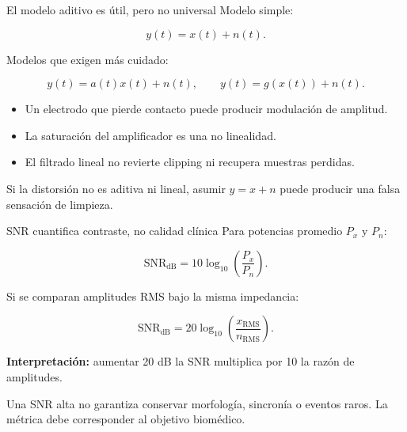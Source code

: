 \documentclass[
  ignorenonframetext,
  aspectratio=169,
  spanish,
  professionalfonts]{beamer}
\providecommand{\tightlist}{%
  \setlength{\itemsep}{0pt}\setlength{\parskip}{0pt}}
\begin{document}
\begin{frame}[shrink]{El modelo aditivo es útil, pero no universal}
\protect{}\label{el-modelo-aditivo-es-uxfatil-pero-no-universal}
Modelo simple:

\[
y(t)=x(t)+n(t).
\]

Modelos que exigen más cuidado:

\[
y(t)=a(t)x(t)+n(t), \qquad
y(t)=g\!\left(x(t)\right)+n(t).
\]

\begin{itemize}
\tightlist
\item
  Un electrodo que pierde contacto puede producir modulación de
  amplitud.
\item
  La saturación del amplificador es una no linealidad.
\item
  El filtrado lineal no revierte clipping ni recupera muestras perdidas.
\end{itemize}

\begin{tcolorbox}[enhanced jigsaw, arc=.35mm, bottomrule=.15mm, bottomtitle=1mm, breakable, colback=white, colbacktitle=quarto-callout-important-color!10!white, colframe=quarto-callout-important-color-frame, coltitle=black, left=2mm, leftrule=.75mm, opacityback=0, opacitybacktitle=0.6, rightrule=.15mm, title={Límite metodológico}, titlerule=0mm, toprule=.15mm, toptitle=1mm]

Si la distorsión no es aditiva ni lineal, asumir \(y=x+n\) puede
producir una falsa sensación de limpieza.

\end{tcolorbox}
\end{frame}

\begin{frame}[shrink]{SNR cuantifica contraste, no calidad clínica}
\protect{}\label{snr-cuantifica-contraste-no-calidad-cluxednica}
Para potencias promedio \(P_x\) y \(P_n\):

\[
\mathrm{SNR}_{\mathrm{dB}}=10\log_{10}\!\left(\frac{P_x}{P_n}\right).
\]

Si se comparan amplitudes RMS bajo la misma impedancia:

\[
\mathrm{SNR}_{\mathrm{dB}}=20\log_{10}\!\left(\frac{x_{\mathrm{RMS}}}{n_{\mathrm{RMS}}}\right).
\]

\textbf{Interpretación:} aumentar 20 dB la SNR multiplica por 10 la
razón de amplitudes.

\begin{tcolorbox}[enhanced jigsaw, arc=.35mm, bottomrule=.15mm, bottomtitle=1mm, breakable, colback=white, colbacktitle=quarto-callout-warning-color!10!white, colframe=quarto-callout-warning-color-frame, coltitle=black, left=2mm, leftrule=.75mm, opacityback=0, opacitybacktitle=0.6, rightrule=.15mm, title={Precaución}, titlerule=0mm, toprule=.15mm, toptitle=1mm]

Una SNR alta no garantiza conservar morfología, sincronía o eventos
raros. La métrica debe corresponder al objetivo biomédico.

\end{tcolorbox}
\end{frame}
\end{document}
